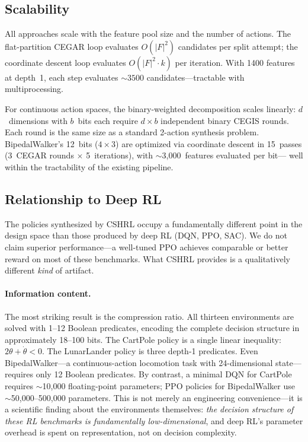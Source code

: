 \documentclass[9pt,a4paper]{article}
\theoremstyle{plain}
\theoremstyle{definition}
\theoremstyle{remark}
\begin{document}
\subsection{Scalability}

All approaches scale with the feature pool size and the number
of actions. The flat-partition CEGAR loop evaluates
$O(|F|^2)$ candidates per split attempt; the coordinate descent
loop evaluates $O(|F|^2 \cdot k)$ per iteration. With 1400
features at depth~1, each step evaluates ${\sim}3500$
candidates---tractable with multiprocessing.

For continuous action spaces, the binary-weighted decomposition
scales linearly: $d$~dimensions with $b$~bits each require
$d \times b$ independent binary CEGIS rounds. Each round
is the same size as a standard 2-action synthesis problem.
BipedalWalker's 12~bits ($4 \times 3$) are optimized via
coordinate descent in 15~passes (3~CEGAR rounds $\times$
5~iterations), with $\sim$3,000~features evaluated per bit---
well within the tractability of the existing pipeline.

\subsection{Relationship to Deep RL}

The policies synthesized by CSHRL occupy a fundamentally different
point in the design space than those produced by deep RL (DQN,
PPO, SAC).  We do not claim superior performance---a well-tuned
PPO achieves comparable or better reward on most of these
benchmarks.  What CSHRL provides is a qualitatively different
\emph{kind} of artifact.

\paragraph{Information content.}
The most striking result is the compression ratio.  All thirteen
environments are solved with 1--12 Boolean predicates, encoding
the complete decision structure in approximately 18--100 bits.
The CartPole policy is a single linear inequality:
$2\theta + \dot\theta < 0$.  The LunarLander policy is three
depth-1 predicates.  Even BipedalWalker---a continuous-action
locomotion task with 24-dimensional state---requires only 12
Boolean predicates.  By contrast, a minimal DQN for CartPole
requires ${\sim}$10{,}000 floating-point parameters; PPO
policies for BipedalWalker use ${\sim}$50{,}000--500{,}000
parameters.  This is not merely an engineering
convenience---it is a scientific finding about the environments
themselves: \emph{the decision structure of these RL benchmarks
is fundamentally low-dimensional}, and deep RL's parameter
overhead is spent on representation, not on decision complexity.
\end{document}
